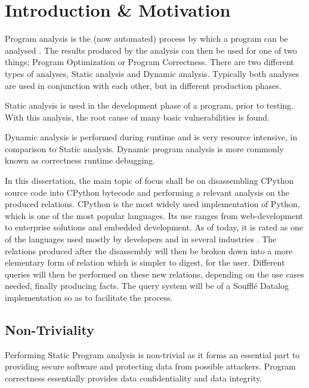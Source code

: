 \documentclass[12pt, a4paper]{report}
\theoremstyle{definition}
\theoremstyle{definition}%
\theoremstyle{definition}%
\theoremstyle{definition}%
\theoremstyle{definition}%
\theoremstyle{definition}%
\begin{document}
\chapter{Introduction \& Motivation}
    \par Program analysis is the (now automated) process by which a program can be analysed \cite{nielson2004principles}. The results produced 
    by the analysis can then be used for one of two things; Program Optimization or Program Correctness. There are two different
    types of analyses, Static analysis and Dynamic analysis. Typically both analyses are used in conjunction with each other, but in different
    production phases. 
    \par Static analysis is used in the development phase of a program, prior to testing. With this analysis, the root cause 
    of many basic vulnerabilities is found.
    \par Dynamic analysis is performed during runtime and is very resource intensive, in comparison to Static analysis. 
    Dynamic program analysis is more commonly known as correctness runtime debugging. \cite{bruegge1993framework}
    \par In this dissertation, the main topic of focus shall be on disassembling CPython source code into 
    CPython bytecode and performing a relevant analysis on the produced relations.
    CPython is the most widely used implementation of Python, which is one of the most popular languages. 
    Its use ranges from web-development to enterprise solutions and embedded development. As of today, it is 
    rated as one of the languages used mostly by developers and in several industries \cite{pyStat}. 
    The relations produced after the disassembly will then be broken down into a more elementary form 
    of relation which is simpler to digest, for the user. Different queries will then be performed on these 
    new relations, depending on the use cases needed, finally producing facts. The query system will be 
    of a Soufflé Datalog implementation so as to facilitate the process.
    \section{Non-Triviality}
    \par Performing Static Program analysis is non-trivial as it forms an essential part to providing secure software and protecting data
    from possible attackers. Program correctness essentially provides data confidentiality and data integrity. \cite{moller2012static} 
    
\end{document}
